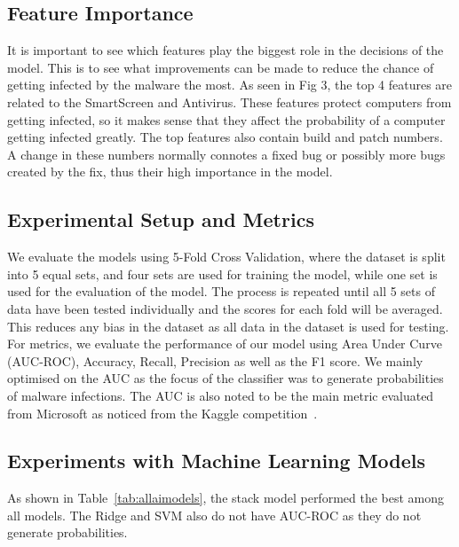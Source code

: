 \documentclass[pdflatex,sn-basic,Numbered]{sn-jnl}%
\theoremstyle{thmstyleone}%
\theoremstyle{thmstyletwo}%
\theoremstyle{thmstylethree}%
\begin{document}
\subsection{Feature Importance}\label{subsec:feature-importance}
It is important to see which features play the biggest role in the decisions of the model.
This is to see what improvements can be made to reduce the chance of getting infected by the malware the most.
As seen in Fig 3, the top 4 features are related to the SmartScreen and Antivirus.
These features protect computers from getting infected, so it makes sense that they affect the probability of a computer getting infected greatly.
The top features also contain build and patch numbers.
A change in these numbers normally connotes a fixed bug or possibly more bugs created by the fix, thus their high importance in the model.

\subsection{Experimental Setup and Metrics}\label{subsec:experimental-setup-and-metrics}
We evaluate the models using 5-Fold Cross Validation, where the dataset is split into 5 equal sets, and four sets are used for training the model, while one set is used for the evaluation of the model.
The process is repeated until all 5 sets of data have been tested individually and the scores for each fold will be averaged.
This reduces any bias in the dataset as all data in the dataset is used for testing.
For metrics, we evaluate the performance of our model using Area Under Curve (AUC-ROC), Accuracy, Recall, Precision as well as the F1 score.
We mainly optimised on the AUC as the focus of the classifier was to generate probabilities of malware infections.
The AUC is also noted to be the main metric evaluated from Microsoft as noticed from the Kaggle competition~\cite{microsoft-malware-prediction}.


\subsection{Experiments with Machine Learning Models}\label{subsec:experiments-with-machine-learning-models}
As shown in Table~\ref{tab:allaimodels}, the stack model performed the best among all models.
The Ridge and SVM also do not have AUC-ROC as they do not generate probabilities.
\end{document}
